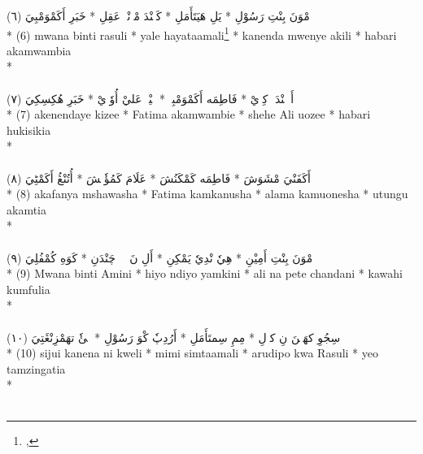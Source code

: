 \documentclass[a4paper, 12pt]{report}
\begin{document}
\begin{center}
\textarabic{(٦) \textcolor{mygreen}{مْوَنَ بِنْتِ رَسُوْلِ  * يَلِ هَيَتَأَمَلِ  * كَنٖنْدَ مْوٖنْيٖ عَقِلِ  * خَبَرِ أَكَمْوَمْبِيَ }} \\* 
(6) mwana binti rasuli  * yale hayataamali\footnote{, }   * kanenda mwenye akili  * habari akamwambia  \\* 
 \\ 
\\[8mm] 

\textarabic{(٧) \textcolor{mygreen}{أَكٖنٖنْدَءٖ كِزٖيْ  * فَاطِمَه أَكَمْوَمْبِيٖ  * شٖيْحٖ عَليْ أُوٗزٖيْ  * خَبَرِ هُكِسِكِيَ }} \\* 
(7) akenendaye kizee  * Fatima akamwambie  * shehe Ali uozee  * habari hukisikia  \\* 
 \\ 
\\[8mm] 

\textarabic{(٨) \textcolor{mygreen}{أَكَفَنْيَ مْشَوَشَ  * فَاطِمَه كَمْكَنُشَ  * عَلَامَ كَمُؤٗنٖشَ  * أُتُنْڠُ أَكَمْٹِيَ }} \\* 
(8) akafanya mshawasha  * Fatima kamkanusha  * alama kamuonesha  * utungu akamtia  \\* 
 \\ 
\\[8mm] 

\textarabic{(٩) \textcolor{mygreen}{مْوَنَ بِنْتِ أَمِيْنِ  * هِيٗ نْدِيٗ يَمْكِنِ  * أَلِ نَ پٖٹٖ چَنْدَنِ  * كَوَهِ كُمْفُلِيَ }} \\* 
(9) Mwana binti Amini  * hiyo ndiyo yamkini  * ali na pete chandani  * kawahi kumfulia  \\* 
 \\ 
\\[8mm] 

\textarabic{(١٠) \textcolor{mygreen}{سِجُوِ كهَنٖنَ نِ كوٖلِ  * مِمِ سِمتَأَمَلِ  * أَرُدِپٗ كْوَ رَسُوْلِ  * يٖئٗ تهَمْزِنْڠَتِيَ }} \\* 
(10) sijui kanena ni kweli  * mimi simtaamali  * arudipo kwa Rasuli  * yeo tamzingatia  \\* 
 \\ 
\\[8mm] 


\end{center}
\end{document}
